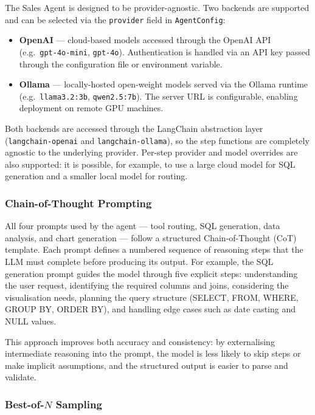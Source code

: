 \documentclass[11pt,a4paper]{article}
\begin{document}
The Sales Agent is designed to be provider-agnostic. Two backends are supported and
can be selected via the \texttt{provider} field in \texttt{AgentConfig}:

\begin{itemize}
    \item \textbf{OpenAI} — cloud-based models accessed through the OpenAI API
          (e.g.\ \texttt{gpt-4o-mini}, \texttt{gpt-4o}). Authentication is handled
          via an API key passed through the configuration file or environment variable.
    \item \textbf{Ollama} — locally-hosted open-weight models served via the Ollama
          runtime (e.g.\ \texttt{llama3.2:3b}, \texttt{qwen2.5:7b}). The server URL
          is configurable, enabling deployment on remote GPU machines.
\end{itemize}

Both backends are accessed through the LangChain abstraction layer
(\texttt{langchain-openai} and \texttt{langchain-ollama}), so the step functions
are completely agnostic to the underlying provider. Per-step provider and model
overrides are also supported: it is possible, for example, to use a large cloud
model for SQL generation and a smaller local model for routing.

\subsubsection{Chain-of-Thought Prompting}

All four prompts used by the agent — tool routing, SQL generation, data analysis,
and chart generation — follow a structured Chain-of-Thought (CoT)~\cite{wei2022chain}
template. Each prompt defines a numbered sequence of reasoning steps that the LLM
must complete before producing its output. For example, the SQL generation prompt
guides the model through five explicit steps: understanding the user request,
identifying the required columns and joins, considering the visualisation needs,
planning the query structure (SELECT, FROM, WHERE, GROUP BY, ORDER BY), and handling
edge cases such as date casting and NULL values.

This approach improves both accuracy and consistency: by externalising intermediate
reasoning into the prompt, the model is less likely to skip steps or make implicit
assumptions, and the structured output is easier to parse and validate.

\subsubsection{Best-of-\texorpdfstring{$N$}{N} Sampling}
\end{document}
